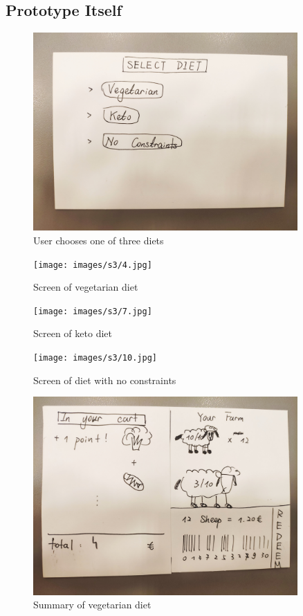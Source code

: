 \clearpage
\subsection{Prototype Itself}

\begin{figure}[H]
	\centering
	\includegraphics[trim={10em 10em 10em 10em},  clip, width=0.90\textwidth]{images/s3/1.jpg}
	\caption{ User chooses one of three diets }
	\label{s3:menu}
\end{figure}

\begin{figure}[H]
	\centering
	\texttt{[image: images/s3/4.jpg]}
	\caption{ Screen of vegetarian diet }
	\label{s3:vege}
\end{figure}

\begin{figure}[H]
	\centering
	\texttt{[image: images/s3/7.jpg]}
	\caption{ Screen of keto diet }
	\label{s3:keto}
\end{figure}

\begin{figure}[H]
	\centering
	\texttt{[image: images/s3/10.jpg]}
	\caption{ Screen of diet with no constraints }
	\label{s3:nocons}
\end{figure}

\begin{figure}[H]
	\centering
	\includegraphics[trim={10em 10em 10em 10em}, clip, width=0.9\textwidth]{images/s3/5.jpg}
	\caption{ Summary of vegetarian diet }
	\label{s3:sumvege}
\end{figure}

